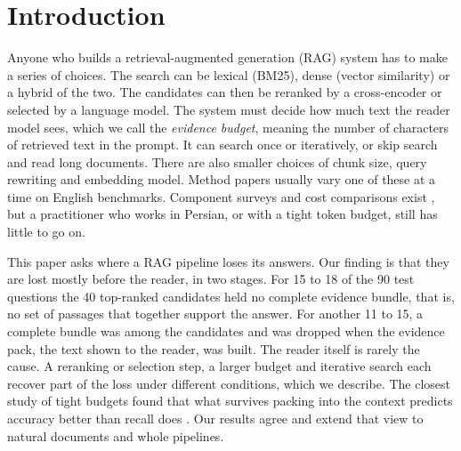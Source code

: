 \section{Introduction}
\label{sec:intro}

Anyone who builds a retrieval-augmented generation (RAG) system has to make a series of choices. The search can be lexical (BM25), dense (vector similarity) or a hybrid of the two. The candidates can then be reranked by a cross-encoder or selected by a language model. The system must decide how much text the reader model sees, which we call the \emph{evidence budget}, meaning the number of characters of retrieved text in the prompt. It can search once or iteratively, or skip search and read long documents. There are also smaller choices of chunk size, query rewriting and embedding model. Method papers usually vary one of these at a time on English benchmarks. Component surveys and cost comparisons exist \citep{wang2024bestpractices,li2024selfroute,ferrazzi2026agentic}, but a practitioner who works in Persian, or with a tight token budget, still has little to go on.

This paper asks where a RAG pipeline loses its answers. Our finding is that they are lost mostly before the reader, in two stages. For 15 to 18 of the 90 test questions the 40 top-ranked candidates held no complete evidence bundle, that is, no set of passages that together support the answer. For another 11 to 15, a complete bundle was among the candidates and was dropped when the evidence pack, the text shown to the reader, was built. The reader itself is rarely the cause. A reranking or selection step, a larger budget and iterative search each recover part of the loss under different conditions, which we describe. The closest study of tight budgets found that what survives packing into the context predicts accuracy better than recall does \citep{bala2026recall}. Our results agree and extend that view to natural documents and whole pipelines.

